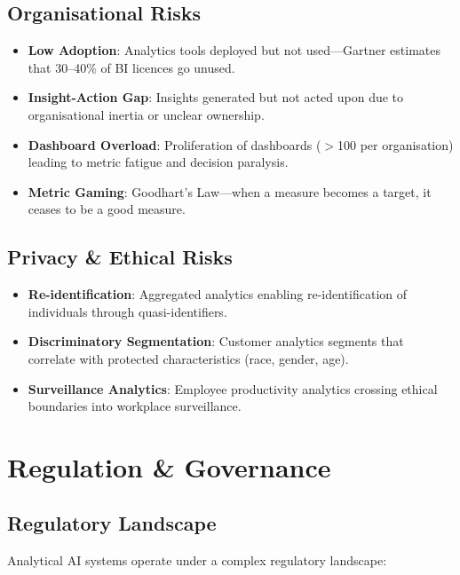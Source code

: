 \documentclass[12pt, a4paper]{article}
\begin{document}
\subsection{Organisational Risks}

\begin{itemize}
    \item \textbf{Low Adoption}: Analytics tools deployed but not used---Gartner estimates that 30--40\% of BI licences go unused.
    \item \textbf{Insight-Action Gap}: Insights generated but not acted upon due to organisational inertia or unclear ownership.
    \item \textbf{Dashboard Overload}: Proliferation of dashboards ($>$100 per organisation) leading to metric fatigue and decision paralysis.
    \item \textbf{Metric Gaming}: Goodhart's Law---when a measure becomes a target, it ceases to be a good measure.
\end{itemize}

\subsection{Privacy \& Ethical Risks}

\begin{itemize}
    \item \textbf{Re-identification}: Aggregated analytics enabling re-identification of individuals through quasi-identifiers.
    \item \textbf{Discriminatory Segmentation}: Customer analytics segments that correlate with protected characteristics (race, gender, age).
    \item \textbf{Surveillance Analytics}: Employee productivity analytics crossing ethical boundaries into workplace surveillance.
\end{itemize}

\section{Regulation \& Governance}\label{sec:governance}

\subsection{Regulatory Landscape}
Analytical AI systems operate under a complex regulatory landscape:
\end{document}
